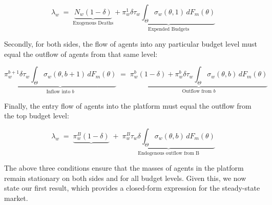\begin{equation} 
    \lambda_w\;=\; \underbrace{N_w (1-\delta)}_{\text{Exogenous Deaths}} + \underbrace{\pi_w^1 \delta \tau_w\int_{\Theta}\sigma_w(\theta,1)\,dF_{m}(\theta)}_{\text{Expended Budgets}} 
\end{equation} 

Secondly, for both sides, the flow of agents into any particular budget level must equal the outflow of agents from that same level: 

\begin{equation}
    \underbrace{\pi_w^{b+1} \delta \tau_w \int_{\Theta} \sigma_w(\theta,b+1)\,dF_{m}(\theta)}_{\text{Inflow into $b$}} \;=\; \underbrace{\pi_w^{b} (1-\delta) + \pi_w^{b} \delta \tau_w\int_{\Theta} \sigma_w(\theta,b)\,dF_{m}(\theta)}_{\text{Outflow from $b$}}
\end{equation}

Finally, the entry flow of agents into the platform must equal the outflow from the top budget level:

\begin{equation}
    \lambda_w \;=\; \underbrace{\pi_w^{B}(1-\delta)} \;+\; \underbrace{\pi_w^{B} \tau_w \delta \int_{\Theta} \sigma_w(\theta,b)\,dF_{m}(\theta)}_{\text{Endogenous outflow from B}}
\end{equation}

% 

The above three conditions ensure that the masses of agents in the platform remain stationary on both sides and for all budget levels. Given this, we now state our first result, which provides a closed-form expression for the steady-state market.  


\begin{comment}
\begin{equation} 
    \underbrace{\lambda_m \Big( F_m(\theta'')-F_m(\theta') \Big)}_{\text{Entering Agents}}\;=\;\underbrace{(1-\delta)N^m(\sigma)}_{\text{Exogenous Deaths}}+\quad  \underbrace{\delta N^m(\sigma)  G^m_b(1 \,|\, \sigma)\int_{\Theta}\sigma_m(\theta,1)\,dG^w_\theta(\theta \,|\, \sigma)}_{\text{Expended Budgets}} 
\end{equation} 

\begin{equation}
    \underbrace{\left(\delta  \int_{\Theta}\sigma_m(\theta,b+1)\,dw_\theta(\theta \,|\, \sigma)\right)N_mR^m_{b+1}}_{\text{Transitions into budget b}}\;=\;\underbrace{\left((1-\delta)+\delta \int_{\Theta} \sigma_m(\theta,b)\,dw_\theta(\theta \,|\, \sigma)\right)N^m R^m_{b}}_{\text{Transitions out of budget b}}
\end{equation}

\begin{equation}
    \underbrace{\lambda_m \Big(F_m(\theta'')-F_m(\theta')\Big)}_{\text{Transitions into budget level B}}\;=\;\underbrace{\left((1-\delta)+\delta \int_{\Theta} \mu(\theta,b)\,dw_\theta(\theta \,|\, \sigma)\right)N_mR^m_{B}}_{\text{Transitions out of budget level B}}
\end{equation} 
\end{comment}

